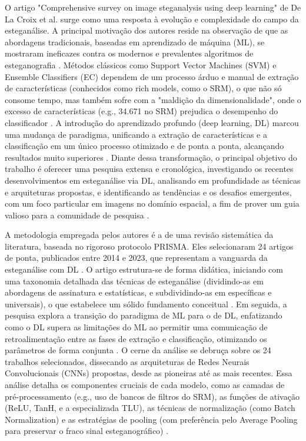 \documentclass[12pt]{article}
\begin{document}
O artigo "Comprehensive survey on image steganalysis using deep learning" de De
La Croix et al. surge como uma resposta à evolução e complexidade do campo da
esteganálise. A principal motivação dos autores reside na observação de que as
abordagens tradicionais, baseadas em aprendizado de máquina (ML), se mostraram
ineficazes contra os modernos e prevalentes algoritmos de esteganografia
\cite{LaCroix2024survey}. Métodos clássicos como Support Vector Machines (SVM)
e Ensemble Classifiers (EC) dependem de um processo árduo e manual de extração
de características (conhecidos como rich models, como o SRM), o que não só
consome tempo, mas também sofre com a "maldição da dimensionalidade", onde o
excesso de características (e.g., 34.671 no SRM) prejudica o desempenho do
classificador \cite{LaCroix2024survey}. A introdução do aprendizado profundo
(deep learning, DL) marcou uma mudança de paradigma, unificando a extração de
características e a classificação em um único processo otimizado e de ponta a
ponta, alcançando resultados muito superiores \cite{LaCroix2024survey}. Diante
dessa transformação, o principal objetivo do trabalho é oferecer uma pesquisa
extensa e cronológica, investigando os recentes desenvolvimentos em
esteganálise via DL, analisando em profundidade as técnicas e arquiteturas
propostas, e identificando as tendências e os desafios emergentes, com um foco
particular em imagens no domínio espacial, a fim de prover um guia valioso para
a comunidade de pesquisa \cite{LaCroix2024survey}.

A metodologia empregada pelos autores é a de uma revisão sistemática da
literatura, baseada no rigoroso protocolo PRISMA. Eles selecionaram 24 artigos
de ponta, publicados entre 2014 e 2023, que representam a vanguarda da
esteganálise com DL \cite{LaCroix2024survey}. O artigo estrutura-se de forma
didática, iniciando com uma taxonomia detalhada das técnicas de esteganálise
(dividindo-as em abordagens de assinatura e estatísticas, e subdividindo-as em
específicas e universais), o que estabelece um sólido fundamento conceitual
\cite{LaCroix2024survey}. Em seguida, a pesquisa explora a transição do
paradigma de ML para o de DL, enfatizando como o DL supera as limitações do ML
ao permitir uma comunicação de retroalimentação entre as fases de extração e
classificação, otimizando os parâmetros de forma conjunta
\cite{LaCroix2024survey}. O cerne da análise se debruça sobre os 24 trabalhos
selecionados, dissecando as arquiteturas de Redes Neurais Convolucionais (CNNs)
propostas, desde as pioneiras até as mais recentes. Essa análise detalha os
componentes cruciais de cada modelo, como as camadas de pré-processamento
(e.g., uso de bancos de filtros do SRM), as funções de ativação (ReLU, TanH, e
a especializada TLU), as técnicas de normalização (como Batch Normalization) e
as estratégias de pooling (com preferência pelo Average Pooling para preservar
o fraco sinal esteganográfico) \cite{LaCroix2024survey}.
\end{document}
